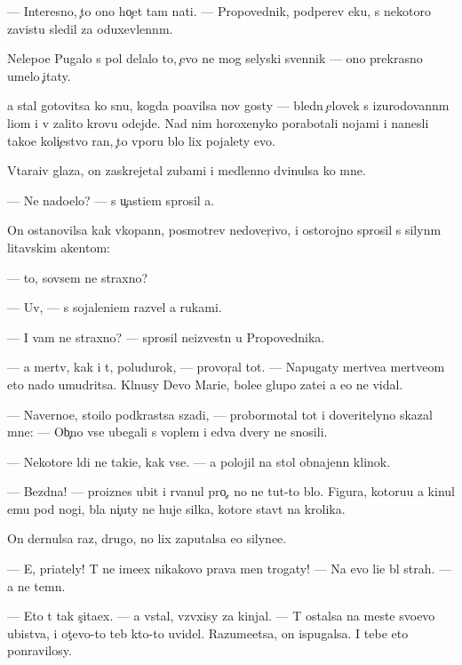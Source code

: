 \documentclass[10pt]{book}
\begin{document}
— Interesno, {\c}to ono ho{\c}et tam na{\y}ti. — Propovednik, podperev {\x}eku, s nekotoro{\y} zavist{\y}u sledil za oduxevlenn{\yi}m.

Nelepo{\y}e Pugalo s pol{\ia} delalo to, {\c}evo ne mog selyski{\y} sv{\ia}{\x}ennik — ono prekrasno umelo {\c}itaty.

{\Y}a stal gotovitsa ko snu, kogda po{\y}avilsa nov{\yi}{\y} gosty — bledn{\yi}{\y} {\c}elovek s izurodovann{\yi}m li{\q}om i v zalito{\y} krov{\y}u odejde. Nad nim horoxenyko porabotali nojami i nanesli tako{\y}e koli{\c}estvo ran, {\c}to vporu b{\yi}lo lix pojalety {\y}evo.

V{\yi}tara{\x}iv glaza, on zaskrejetal zubami i medlenno dvinulsa ko mne.

— Ne nado{\y}elo? — s u{\c}asti{\y}em sprosil {\y}a.

On ostanovilsa kak vkopann{\yi}{\y}, posmotrev nedover{\c}ivo, i ostorojno sprosil s silyn{\yi}m litavskim ak{\q}entom:

— {\C}to, sovsem ne straxno?

— Uv{\yi}, — s sojaleni{\y}em razvel {\y}a rukami.

— I vam ne straxno? — sprosil ne{\y}izvestn{\yi}{\y} u Propovednika.

— {\Y}a mertv, kak i t{\yi}, poludurok, — provor{\c}al tot. — Napugaty mertve{\q}a mertve{\q}om eto nado umudritsa. Kl{\ia}nusy Devo{\y} Mari{\y}e{\y}, bole{\y}e glupo{\y} zate{\y}i {\y}a {\y}e{\x}o ne vidal.

— Naverno{\y}e, sto{\y}ilo podkrastsa szadi, — probormotal tot i doveritelyno skazal mne: — Ob{\yi}{\c}no vse ubegali s voplem i {\y}edva dvery ne snosili.

— Nekotor{\yi}{\y}e l{\iu}di ne taki{\y}e, kak vse. — {\Y}a polojil na stol obnajenn{\yi}{\y} klinok.

— Bezdna! — pro{\y}iznes ubit{\yi}{\y} i rvanul pro{\c}, no ne tut-to b{\yi}lo. Figura, kotoru{\y}u {\y}a kinul {\y}emu pod nogi, b{\yi}la ni{\c}uty ne huje silka, kotor{\yi}{\y}e stav{\ia}t na krolika.

On dernulsa raz, drugo{\y}, no lix zaputalsa {\y}e{\x}o silyne{\y}e.

— E{\y}, pri{\y}ately! T{\yi} ne ime{\y}ex nikakovo prava men{\ia} trogaty! — Na {\y}evo li{\q}e b{\yi}l strah. — {\Y}a ne temn{\yi}{\y}.

— Eto t{\yi} tak s{\c}ita{\y}ex. — {\Y}a vstal, vz{\ia}vxisy za kinjal. — T{\yi} ostalsa na meste svo{\y}evo ubi{\y}stva, i ot{\c}evo-to teb{\ia} kto-to uvidel. Razume{\y}etsa, on ispugalsa. I tebe eto ponravilosy.
\end{document}
